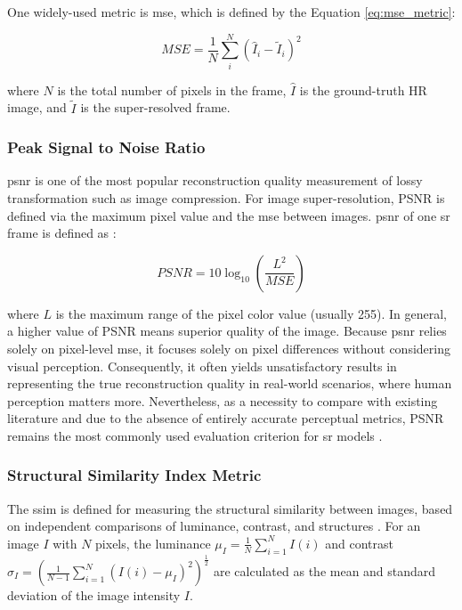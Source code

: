 \documentclass[conference]{IEEEtran}
\begin{document}
One widely-used metric is \acrfull{mse}, which is defined by the Equation \ref{eq:mse_metric}:

\begin{equation} \label{eq:mse_metric}
    MSE = \frac{1}{N} \sum_{i}^{N} (\hat{I}_i - \tilde{I}_i)^2
\end{equation}

where $N$ is the total number of pixels in the frame, $\hat{I}$ is the ground-truth HR image, and $\tilde{I}$ is the super-resolved frame.

\subsubsection{Peak Signal to Noise Ratio}

\Acrfull{psnr} is one of the most popular reconstruction quality measurement of lossy transformation such as image compression. For image
super-resolution, PSNR is defined via the maximum pixel value and the \acrshort{mse} between images. \Acrshort{psnr} of one \acrshort{sr} frame is defined as \cite{video_super_resolution_survey_2020}:

\begin{equation}  \label{eq:psnr_metric}
    PSNR = 10 \log_{10} (\frac{L^2}{MSE})
\end{equation}

where $L$ is the maximum range of the pixel color value (usually 255). In general, a higher value of PSNR means superior quality of the image. Because \acrshort{psnr} relies solely on pixel-level \acrshort{mse}, it focuses solely on pixel differences without considering visual perception. Consequently, it often yields unsatisfactory results in representing the true reconstruction quality in real-world scenarios, where human perception matters more. Nevertheless, as a necessity to compare with existing literature and due to the absence of entirely accurate perceptual metrics, PSNR remains the most commonly used evaluation criterion for \acrshort{sr} models \cite{deep_learning_image_sr_2020}.

\subsubsection{Structural Similarity Index Metric}

The \acrfull{ssim} is defined for measuring the structural similarity between images, based on independent comparisons of luminance, contrast, and structures \cite{ssim_2004}. For an image $I$ with $N$ pixels, the luminance $\mu_I = \frac{1}{N} \sum_{i=1}^{N} I(i)$ and contrast $\sigma_I = (\frac{1}{N-1} \sum_{i=1}^{N} (I(i) - \mu_I)^2)^{\frac{1}{2}}$ are calculated as the mean and standard deviation of the image intensity $I$.
\end{document}

